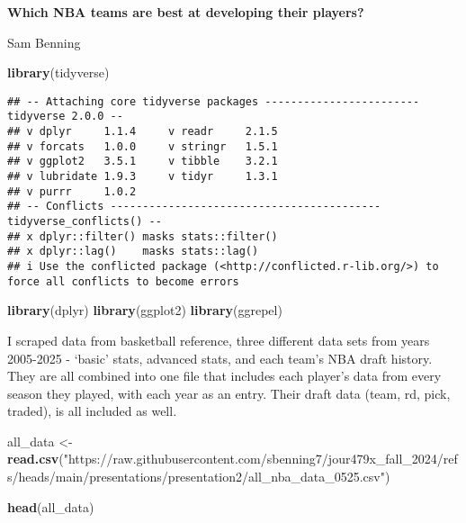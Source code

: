 \documentclass[
]{article}
\author{}
\date{\vspace{-2.5em}}
\newenvironment{Shaded}{\begin{snugshade}}{\end{snugshade}}
\newcommand{\FunctionTok}[1]{\textcolor[rgb]{0.13,0.29,0.53}{\textbf{#1}}}
\newcommand{\NormalTok}[1]{#1}
\newcommand{\OtherTok}[1]{\textcolor[rgb]{0.56,0.35,0.01}{#1}}
\newcommand{\StringTok}[1]{\textcolor[rgb]{0.31,0.60,0.02}{#1}}
\begin{document}
\textbf{Which NBA teams are best at developing their players?}

Sam Benning

\begin{Shaded}
\begin{Highlighting}[]
\FunctionTok{library}\NormalTok{(tidyverse)}
\end{Highlighting}
\end{Shaded}

\begin{verbatim}
## -- Attaching core tidyverse packages ------------------------ tidyverse 2.0.0 --
## v dplyr     1.1.4     v readr     2.1.5
## v forcats   1.0.0     v stringr   1.5.1
## v ggplot2   3.5.1     v tibble    3.2.1
## v lubridate 1.9.3     v tidyr     1.3.1
## v purrr     1.0.2     
## -- Conflicts ------------------------------------------ tidyverse_conflicts() --
## x dplyr::filter() masks stats::filter()
## x dplyr::lag()    masks stats::lag()
## i Use the conflicted package (<http://conflicted.r-lib.org/>) to force all conflicts to become errors
\end{verbatim}

\begin{Shaded}
\begin{Highlighting}[]
\FunctionTok{library}\NormalTok{(dplyr)}
\FunctionTok{library}\NormalTok{(ggplot2)}
\FunctionTok{library}\NormalTok{(ggrepel)}
\end{Highlighting}
\end{Shaded}

I scraped data from basketball reference, three different data sets from
years 2005-2025 - `basic' stats, advanced stats, and each team's NBA
draft history. They are all combined into one file that includes each
player's data from every season they played, with each year as an entry.
Their draft data (team, rd, pick, traded), is all included as well.

\begin{Shaded}
\begin{Highlighting}[]
\NormalTok{all\_data }\OtherTok{\textless{}{-}} \FunctionTok{read.csv}\NormalTok{(}\StringTok{"https://raw.githubusercontent.com/sbenning7/jour479x\_fall\_2024/refs/heads/main/presentations/presentation2/all\_nba\_data\_0525.csv"}\NormalTok{)}

\FunctionTok{head}\NormalTok{(all\_data)}
\end{Highlighting}
\end{Shaded}
\end{document}
